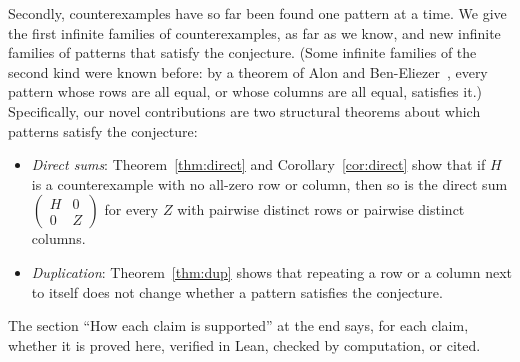 \documentclass{article}
\theoremstyle{plain}
\theoremstyle{definition}
\begin{document}
Secondly, counterexamples have so far been found one pattern at a time. We give the first infinite families of counterexamples, as far as we know, and new infinite families of patterns that satisfy the conjecture. (Some infinite families of the second kind were known before: by a theorem of Alon and Ben-Eliezer~\cite[Theorem~1.5]{ABE}, every pattern whose rows are all equal, or whose columns are all equal, satisfies it.) Specifically, our novel contributions are two structural theorems about which patterns satisfy the conjecture:
\begin{itemize}
    \item \textit{Direct sums}: Theorem~\ref{thm:direct} and Corollary~\ref{cor:direct} show that if $H$ is a counterexample with no all-zero row or column, then so is the direct sum $\begin{pmatrix} H & 0 \\ 0 & Z \end{pmatrix}$ for every $Z$ with pairwise distinct rows or pairwise distinct columns.
    \item \textit{Duplication}: Theorem~\ref{thm:dup} shows that repeating a row or a column next to itself does not change whether a pattern satisfies the conjecture.
\end{itemize}
The section ``How each claim is supported'' at the end says, for each claim, whether it is proved
here, verified in Lean, checked by computation, or cited.
\end{document}
